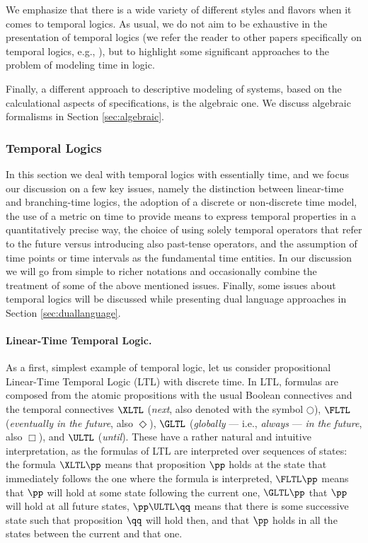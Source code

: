 We emphasize that there is a wide variety of different styles 
and flavors when it comes to temporal logics. As usual, we do 
not aim to be exhaustive in the presentation of temporal logics 
(we refer the reader to other papers specifically on temporal 
logics, e.g., \cite{Eme90,AH93,AH92,Ost92,Hen98,BMN00,FPR}), but 
to highlight some significant approaches to the problem of modeling 
time in logic.

Finally, a different approach to descriptive modeling of systems, 
based on the calculational aspects of specifications, is the 
algebraic one. We discuss algebraic formalisms in Section \ref{sec:algebraic}.


\subsubsection{Temporal Logics} \label{sec:temporallogics} In this
section we deal with temporal logics with essentially  time,
and we focus our discussion on a few key issues, namely the
distinction between linear-time and branching-time logics, the
adoption of a discrete or non-discrete time model, the use of a metric
on time to provide means to express temporal properties in a
quantitatively precise way, the choice of using solely temporal
operators that refer to the future versus introducing also past-tense
operators, and the assumption of time points or time intervals as the
fundamental time entities. In our discussion we will go from simple to
richer notations and occasionally combine the treatment of some of the
above mentioned issues.  Finally, some  issues about
temporal logics will be discussed while presenting dual language
approaches in Section \ref{sec:duallanguage}.


\paragraph{Linear-Time Temporal Logic.}
As a first, simplest example of temporal logic, let us consider 
propositional Linear-Time Temporal Logic (LTL) with discrete 
time. In LTL, formulas are composed from the atomic propositions 
with the usual Boolean connectives and the temporal connectives $\XLTL$ 
(\emph{next}, also denoted with the symbol $\bigcirc$), $\FLTL$ (\emph{eventually 
in the future}, also $\Diamond$), $\GLTL$ (\emph{globally} --- i.e., \emph{always} 
--- \emph{in the future}, also $\Box$), and $\ULTL$ (\emph{until}). These 
have a rather natural and intuitive interpretation, as the formulas 
of LTL are interpreted over  sequences of states: the formula $\XLTL \pp$ 
means that proposition $\pp$ holds at the state that immediately 
follows the one where the formula is interpreted, $\FLTL \pp$ 
means that $\pp$ will hold at some state following the current 
one, $\GLTL \pp$ that $\pp$ will hold at all future states, $\pp \ULTL \qq$ 
means that there is some successive state such that proposition $\qq$ 
will hold then, and that $\pp$ holds in all the states between 
the current and that one.

